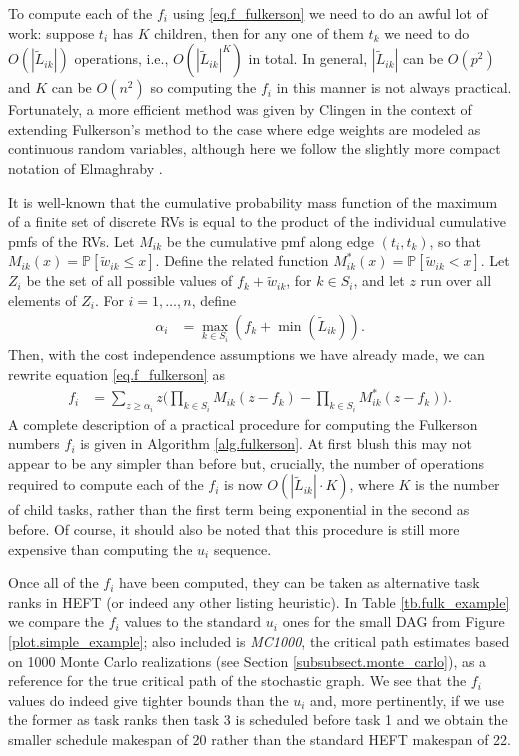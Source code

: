 \documentclass[12pt]{article}
\def\P{\mathbb{P}}
\begin{document}
To compute each of the $f_i$ using \eqref{eq.f_fulkerson} we need to do an awful lot of work: suppose $t_i$ has $K$ children, then for any one of them $t_k$ we need to do $O(|\tilde{L}_{ik}|)$ operations, i.e., $O(|\tilde{L}_{ik}|^K)$ in total. In general, $|\tilde{L}_{ik}|$ can be $O(p^2)$ and $K$ can be $O(n^2)$ so computing the $f_i$ in this manner is not always practical. Fortunately, a more efficient method was given by Clingen \cite{cling64} in the context of extending Fulkerson's method to the case where edge weights are modeled as continuous random variables, although here we follow the slightly more compact notation of Elmaghraby \cite{elmaghraby67}. 

It is well-known that the cumulative probability mass function of the maximum of a finite set of discrete RVs is equal to the product of the individual cumulative pmfs of the RVs. Let $M_{ik}$ be the cumulative pmf along edge $(t_i, t_k)$, so that $M_{ik}(x) = \P[\tilde{w}_{ik} \leq x]$. Define the related function $M_{ik}^{*}(x) = \P[\tilde{w}_{ik} < x]$. Let $Z_i$ be the set of all possible values of $f_k + \tilde{w}_{ik}$, for $k \in S_i$, and let $z$ run over all elements of $Z_i$. For $i = 1, \dots, n$, define 
\begin{align}
\alpha_i &= \max_{k \in S_i}(f_k + \min(\tilde{L}_{ik})).
\end{align}
Then, with the cost independence assumptions we have already made, we can rewrite equation \eqref{eq.f_fulkerson} as 
\begin{align}
f_i &= \sum_{z \geq \alpha_i} z \bigg( \prod_{k \in S_i} M_{ik}(z - f_k) - \prod_{k \in S_i} M_{ik}^{*}(z - f_k) \bigg). \label{eq.f_clingen}
\end{align}
A complete description of a practical procedure for computing the Fulkerson numbers $f_i$ is given in Algorithm \ref{alg.fulkerson}. At first blush this may not appear to be any simpler than before but, crucially, the number of  operations required to compute each of the $f_i$ is now $O(|\tilde{L}_{ik}| \cdot K)$, where $K$ is the number of child tasks, rather than the first term being exponential in the second as before. Of course, it should also be noted that this procedure is still more expensive than computing the $u_i$ sequence. 

Once all of the $f_i$ have been computed, they can be taken as alternative task ranks in HEFT (or indeed any other listing heuristic). In Table \ref{tb.fulk_example} we compare the $f_i$ values to the standard $u_i$ ones for the small DAG from Figure \ref{plot.simple_example}; also included is {\em MC1000}, the critical path estimates based on 1000 Monte Carlo realizations (see Section \ref{subsubsect.monte_carlo}), as a reference for the true critical path of the stochastic graph. We see that the $f_i$ values do indeed give tighter bounds than the $u_i$ and, more pertinently, if we use the former as task ranks then task 3 is scheduled before task 1 and we obtain the smaller schedule makespan of 20 rather than the standard HEFT makespan of 22. 
\end{document}
